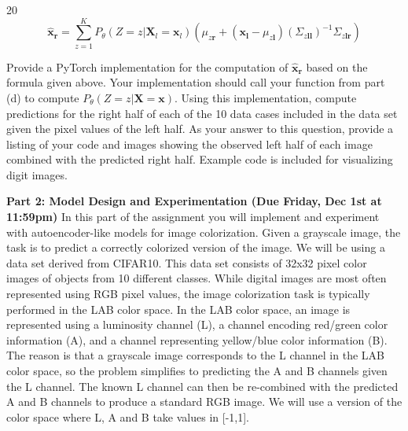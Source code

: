 \documentclass[11pt]{article}
\newcommand{\mbf}[1]{{\mathbf{#1}}}
\begin{document}
\begin{problem}{20}
$$\hat{\mbf{x}}_{\mbf{r}} = \sum_{z=1}^K P_{\theta}(Z=z|\mbf{X}_l=\mbf{x}_l)\left(\mu_{z\mbf{r}} + (\mbf{x}_\mbf{l}-\mu_{z\mbf{l}})(\Sigma_{z\mbf{ll}})^{-1}\Sigma_{z\mbf{lr}}\right)$$

 Provide a PyTorch implementation for the computation of $\hat{\mbf{x}}_{\mbf{r}}$ based on the formula given above. Your implementation should call your function from part (d) to compute $P_{\theta}(Z=z|\mbf{X}=\mbf{x})$. Using this implementation, compute predictions for the right half of each of the 10 data cases included in the data set given the pixel values of the left half. As your answer to this question, provide a listing of your code and images showing the observed left half of each image combined with the predicted right half. Example code is included for visualizing digit images.\\
\end{problem}


\textbf{Part 2: Model Design and  Experimentation (Due Friday, Dec 1st at 11:59pm)} In this part of the assignment you will implement and experiment with autoencoder-like models for image colorization. Given a grayscale image, the task is to predict a correctly colorized version of the image. We will be using a data set derived from CIFAR10. This data set consists of 32x32 pixel color images of objects from 10 different classes. While digital images are most often represented using RGB pixel values, the image colorization task is typically performed in the LAB color space. In the LAB color space, an image is represented using a luminosity channel (L), a channel encoding red/green color information (A), and a channel representing yellow/blue color information (B). The reason is that a grayscale image corresponds to the L channel in the LAB color space, so the problem simplifies to predicting the A and B channels given the L channel. The known L channel can then be re-combined with the predicted A and B channels to produce a standard RGB image. We will use a version of the color space where L, A and B take values in [-1,1].\\
\end{document}
